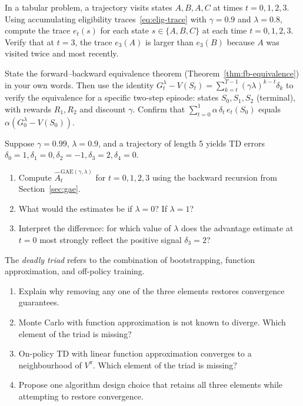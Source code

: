 \begin{exercise}
\label{ex:elig-trace-compute}
In a tabular problem, a trajectory visits states $A, B, A, C$ at times $t=0,1,2,3$.  Using accumulating eligibility traces~\eqref{eq:elig-trace} with $\gamma=0.9$ and $\lambda=0.8$, compute the trace $e_t(s)$ for each state $s\in\{A,B,C\}$ at each time $t=0,1,2,3$.  Verify that at $t=3$, the trace $e_3(A)$ is larger than $e_3(B)$ because $A$ was visited twice and most recently.
\end{exercise}

\begin{exercise}
\label{ex:td-lambda-equiv}
State the forward--backward equivalence theorem (Theorem~\ref{thm:fb-equivalence}) in your own words.  Then use the identity $G_t^\lambda - V(S_t) = \sum_{k=t}^{T-1}(\gamma\lambda)^{k-t}\delta_k$ to verify the equivalence for a specific two-step episode: states $S_0, S_1, S_2$ (terminal), with rewards $R_1, R_2$ and discount $\gamma$.  Confirm that $\sum_{t=0}^{1}\alpha\,\delta_t\,e_t(S_0)$ equals $\alpha(G_0^\lambda - V(S_0))$.
\end{exercise}

\begin{exercise}
\label{ex:gae-compute}
Suppose $\gamma=0.99$, $\lambda=0.9$, and a trajectory of length 5 yields TD errors $\delta_0=1, \delta_1=0, \delta_2=-1, \delta_3=2, \delta_4=0$.
\begin{enumerate}[label=(\alph*)]
  \item Compute $\hat A_t^{\mathrm{GAE}(\gamma,\lambda)}$ for $t=0,1,2,3$ using the backward recursion from Section~\ref{sec:gae}.
  \item What would the estimates be if $\lambda=0$?  If $\lambda=1$?
  \item Interpret the difference: for which value of $\lambda$ does the advantage estimate at $t=0$ most strongly reflect the positive signal $\delta_3=2$?
\end{enumerate}
\end{exercise}

\begin{exercise}
\label{ex:deadly-triad}
The \emph{deadly triad} refers to the combination of bootstrapping, function approximation, and off-policy training.
\begin{enumerate}[label=(\alph*)]
  \item Explain why removing any one of the three elements restores convergence guarantees.
  \item Monte Carlo with function approximation is not known to diverge.  Which element of the triad is missing?
  \item On-policy TD with linear function approximation converges to a neighbourhood of $V^\pi$.  Which element of the triad is missing?
  \item Propose one algorithm design choice that retains all three elements while attempting to restore convergence.
\end{enumerate}
\end{exercise}

